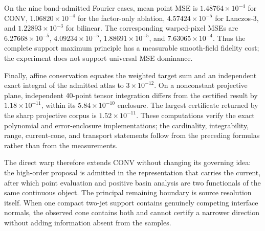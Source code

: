 On the nine band-admitted Fourier cases, mean point MSE is
\(1.48764\times10^{-4}\) for CONV, \(1.06820\times10^{-4}\) for the
factor-only ablation, \(4.57424\times10^{-5}\) for Lanczos-3, and
\(1.22893\times10^{-3}\) for bilinear.  The corresponding warped-pixel MSEs
are \(6.27668\times10^{-5}\), \(4.09234\times10^{-5}\),
\(1.88691\times10^{-5}\), and \(7.63065\times10^{-4}\).  Thus the complete
support maximum principle has a measurable smooth-field fidelity cost; the
experiment does not support universal MSE dominance.

Finally, affine conservation equates the weighted target sum and an
independent exact integral of the admitted atlas to \(3\times10^{-12}\).  On
a nonconstant projective plane, independent 40-point tensor integration
differs from the certified result by \(1.18\times10^{-11}\), within its
\(5.84\times10^{-10}\) enclosure.  The largest certificate returned by the
sharp projective corpus is \(1.52\times10^{-11}\).  These computations verify
the exact polynomial and error-enclosure implementations; the cardinality,
integrability, range, current-cone, and transport statements follow from the
preceding formulas rather than from the measurements.

The direct warp therefore extends CONV without changing its governing idea:
the high-order proposal is admitted in the representation that carries the
current, after which point evaluation and positive basin analysis are two
functionals of the same continuous object.  The principal remaining boundary
is source resolution itself.  When one compact two-jet support contains
genuinely competing interface normals, the observed cone contains both and
cannot certify a narrower direction without adding information absent from
the samples.
